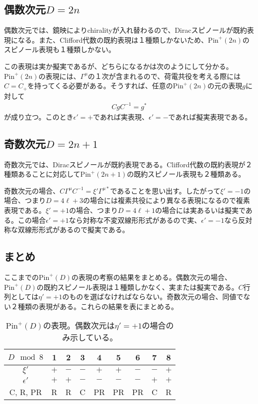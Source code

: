 \documentclass[12pt,a4paper,dvipdfmx]{jlreq}
\newcommand{\Pin}{\mathrm{Pin}^{+}}
\begin{document}
\subsection{偶数次元$D=2n$}
偶数次元では、鏡映によりchiralityが入れ替わるので、Diracスピノールが既約表現になる。また、Clifford代数の既約表現は１種類しかないため、$\Pin(2n)$のスピノール表現も１種類しかない。

この表現は実か擬実であるが、どちらになるかは次のようにして分かる。$\Pin(2n)$の表現には、$\Gamma^{\mu}$の１次が含まれるので、荷電共役を考える際には$C=C_{+}$を持ってくる必要がある。そうすれば、任意の$\Pin(2n)$の元の表現$g$に対して
\begin{align*}
  CgC^{-1}=g^*
\end{align*}
が成り立つ。このとき$\epsilon'=+$であれば実表現、$\epsilon'=-$であれば擬実表現である。

\subsection{奇数次元$D=2n+1$}
奇数次元では、Diracスピノールが既約表現である。Clifford代数の既約表現が２種類あることに対応して$\Pin(2n+1)$の既約スピノール表現も２種類ある。

奇数次元の場合、$C\Gamma^{\mu}C^{-1}=\xi' \Gamma^{\mu*}$であることを思い出す。したがって$\xi'=-1$の場合、つまり$D=4\ell+3$の場合には複素共役により異なる表現になるので複素表現である。$\xi'=+1$の場合、つまり$D=4\ell+1$の場合には実あるいは擬実である。この場合$\epsilon'=+1$なら対称な不変双線形形式があるので実、$\epsilon'=-1$なら反対称な双線形形式があるので擬実である。

\subsection{まとめ}
ここまでの$\Pin(D)$の表現の考察の結果をまとめる。偶数次元の場合、$\Pin(D)$の既約スピノール表現は１種類しかなく、実または擬実である。$C$行列としては$\eta'=+1$のものを選ばなければならない。奇数次元の場合、同値でない２種類の表現がある。これらの結果を表にまとめる。
\begin{table}[htb]
  \begin{center}
    \begin{tabular}{|c|c|c|c|c|c|c|c|c|}\hline
      $D \mod 8$ & 1 & 2 & 3 & 4 & 5 & 6 & 7 & 8\\ \hline
      $\xi'$ & $+$ & $-$ & $-$ & $+$ & $+$ & $-$ & $-$ & $+$ \\\hline
      $\epsilon'$ & $+$ & $+$ & $-$ & $-$ & $-$ & $-$ & $+$ & $+$ \\ \hline
      C, R, PR & R & R & C & PR & PR & PR & C & R \\ \hline
    \end{tabular}
  \end{center} 
  \caption{$\Pin(D)$の表現。偶数次元は$\eta'=+1$の場合のみ示している。}
  \end{table}
\end{document}
